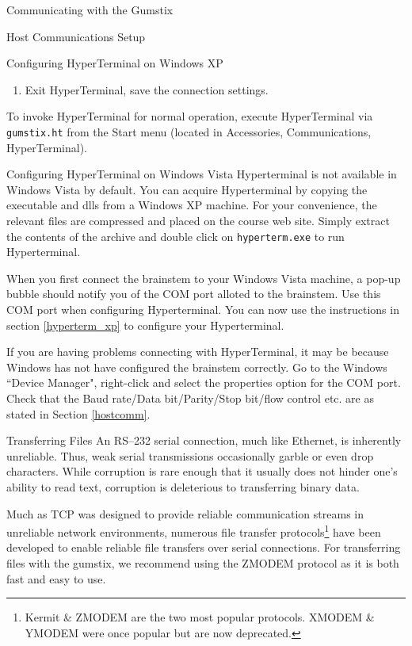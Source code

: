 \documentclass{article}
\begin{document}
\begin{section}{Communicating with the Gumstix}
\begin{subsection}{Host Communications Setup}
\begin{subsubsection}{Configuring HyperTerminal on Windows XP}
\begin{enumerate}
					\item Exit HyperTerminal, save the connection settings.
				\end{enumerate}
				To invoke HyperTerminal for normal operation, execute HyperTerminal via
				\texttt{gumstix.ht} from the Start menu (located in Accessories,
				Communications, HyperTerminal).
			\end{subsubsection}

			\begin{subsection}{Configuring HyperTerminal on Windows Vista}
				Hyperterminal is not available in Windows Vista by default.  You can
				acquire Hyperterminal by copying the executable and dlls from a Windows
				XP machine.  For your convenience, the relevant files are compressed
				and placed on the course web site. Simply extract the
				contents of the archive and double click on \texttt{hyperterm.exe} to
				run Hyperterminal.

				When you first connect the brainstem to your Windows Vista machine, a
				pop-up bubble should notify you of the COM port alloted to the brainstem.
				Use this COM port when configuring Hyperterminal.  You can now use the
				instructions in section \ref{hyperterm_xp} to configure your Hyperterminal.

				If you are having problems connecting with HyperTerminal, it may be
				because Windows has not have configured the brainstem correctly.  Go to the
				Windows ``Device Manager", right-click and select the properties option for the
				COM port.  Check that the Baud rate/Data bit/Parity/Stop bit/flow control etc.
				are as stated in Section \ref{hostcomm}.
			\end{subsection}
		\end{subsection}

		\begin{subsection}{Transferring Files} \label{files}
			An RS--232 serial connection, much like Ethernet, is inherently unreliable.
			Thus, weak serial transmissions occasionally garble or even drop
			characters.  While corruption is rare enough that it usually does not
			hinder one's ability to read text, corruption is deleterious to
			transferring binary data.

			Much as TCP was designed to provide reliable communication streams in
			unreliable network environments, numerous file transfer
			protocols\footnote{Kermit \& ZMODEM are the two most popular protocols.
			XMODEM \& YMODEM were once popular but are now deprecated.} have been
			developed to enable reliable file transfers over serial connections.  For
			transferring files with the gumstix, we recommend using the ZMODEM
			protocol as it is both fast and easy to use.


\end{subsection}
\end{section}
\end{document}
